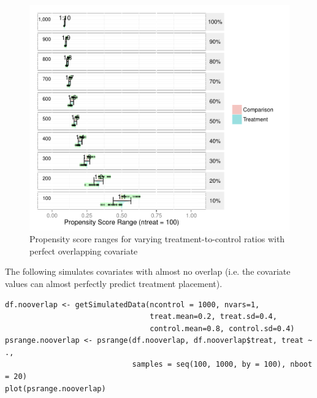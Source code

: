 \begin{singlespace}
\begin{figure}[h!]
\begin{center}
\includegraphics[width=\textwidth]{../Figures2009/PSRanges-Overlap.pdf}
\caption{Propensity score ranges for varying treatment-to-control ratios with perfect overlapping covariate}
\end{center}
\end{figure}

\noindent The following simulates covariates with almost no overlap (i.e. the covariate values can almost perfectly predict treatment placement).

\begin{verbatim}
df.nooverlap <- getSimulatedData(ncontrol = 1000, nvars=1,
                                 treat.mean=0.2, treat.sd=0.4,
                                 control.mean=0.8, control.sd=0.4)
psrange.nooverlap <- psrange(df.nooverlap, df.nooverlap$treat, treat ~ ., 
                             samples = seq(100, 1000, by = 100), nboot = 20)
plot(psrange.nooverlap)
\end{verbatim}


\end{singlespace}
